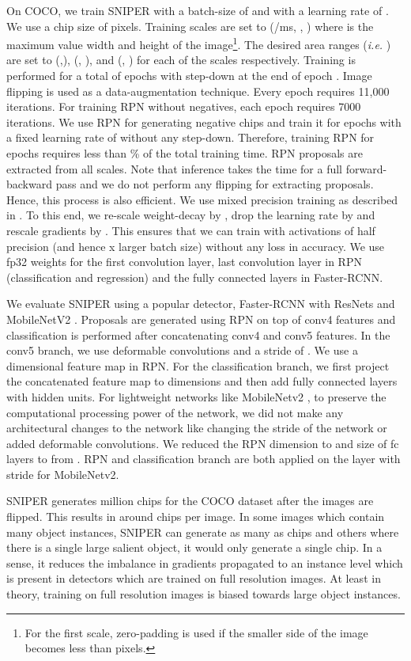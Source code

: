 \documentclass{article}
\begin{document}
On COCO, we train SNIPER with a batch-size of  and with a learning rate of . We use a chip size of  pixels. Training scales are set to (/ms, , ) where  is the maximum value width and height of the image\footnote{For the first scale, zero-padding is used if the smaller side of the image becomes less than  pixels.}. The desired area ranges (\textit{i.e.} ) are set to (,), (, ), and (, ) for each of the scales respectively. Training is performed for a total of  epochs with step-down at the end of epoch . Image flipping is used as a data-augmentation technique. Every epoch requires 11,000 iterations. For training RPN without negatives, each epoch requires 7000 iterations. We use RPN for generating negative chips and train it for  epochs with a fixed learning rate of  without any step-down. Therefore, training RPN for  epochs requires less than \% of the total training time. RPN proposals are extracted from all scales. Note that inference takes  the time for a full forward-backward pass and we do not perform any flipping for extracting proposals. Hence, this process is also efficient. We use mixed precision training as described in \cite{narang2017mixed}. To this end, we re-scale weight-decay by , drop the learning rate by  and rescale gradients by . This ensures that we can train with activations of half precision (and hence x larger batch size) without any loss in accuracy. We use fp32 weights for the first convolution layer, last convolution layer in RPN (classification and regression) and the fully connected layers in Faster-RCNN. 

We evaluate SNIPER using a popular detector, Faster-RCNN with ResNets \cite{he2016deep,he2016identity} and MobileNetV2 \cite{mobilenetv2}. Proposals are generated using RPN on top of conv4 features and classification is performed after concatenating conv4 and conv5 features. In the conv5 branch, we use deformable convolutions and a stride of . We use a  dimensional feature map in RPN. For the classification branch, we first project the concatenated feature map to  dimensions and then add  fully connected layers with  hidden units. For lightweight networks like MobileNetv2 \cite{mobilenetv2}, to preserve the computational processing power of the network, we did not make any architectural changes to the network like changing the stride of the network or added deformable convolutions. We reduced the RPN dimension to  and size of fc layers to  from . RPN and classification branch are both applied on the layer with stride  for MobileNetv2. 

SNIPER generates  million chips for the COCO dataset after the images are flipped. This results in around  chips per image. In some images which contain many object instances, SNIPER can generate as many as  chips and others where there is a single large salient object, it would only generate a single chip. In a sense, it reduces the imbalance in gradients propagated to an instance level which is present in detectors which are trained on full resolution images. At least in theory, training on full resolution images is biased towards large object instances.
\end{document}
